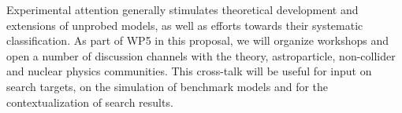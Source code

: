 Experimental attention generally stimulates theoretical development and extensions of unprobed models, as well as efforts towards their systematic classification. 
As part of WP5 in this proposal, we will organize workshops and open a number of discussion channels with the theory, astroparticle, non-collider and nuclear physics communities. 
This cross-talk will be useful for input on search targets, on the simulation of benchmark models and for the contextualization of search results.
